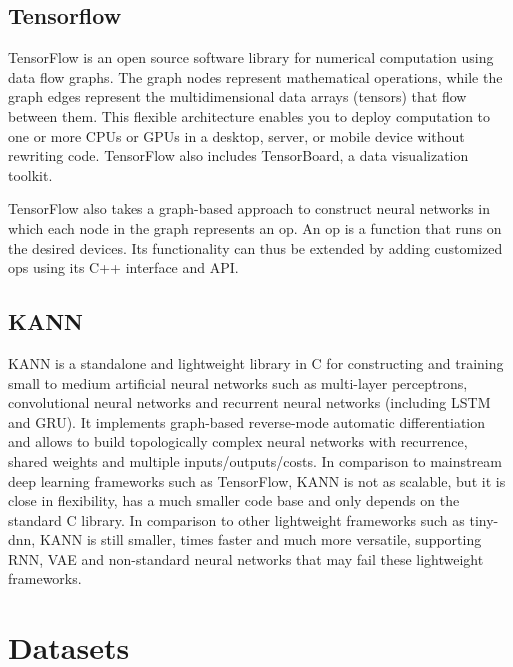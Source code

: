 \subsection{Tensorflow}
TensorFlow is an open source software library for numerical computation using data 
flow graphs. The graph nodes represent mathematical operations, while the graph 
edges represent the multidimensional data arrays (tensors) that flow between them. 
This flexible architecture enables you to deploy computation to one or more CPUs or 
GPUs in a desktop, server, or mobile device without rewriting code. TensorFlow 
also includes TensorBoard, a data visualization toolkit. 

TensorFlow also takes a graph-based approach to construct neural networks in which 
each node in the graph represents an op. An op is a function that runs on the 
desired devices. Its functionality can thus be extended by adding customized ops 
using its C++ interface and API.

\subsection{KANN}
KANN is a standalone and lightweight library in C for constructing and training 
small to medium artificial neural networks such as multi-layer perceptrons, 
convolutional neural networks and recurrent neural networks (including LSTM and GRU). 
It implements graph-based reverse-mode automatic differentiation and allows to build 
topologically complex neural networks with recurrence, shared weights and multiple 
inputs/outputs/costs. In comparison to mainstream deep learning frameworks such as 
TensorFlow, KANN is not as scalable, but it is close in flexibility, has a much smaller 
code base and only depends on the standard C library. In comparison to other 
lightweight frameworks such as tiny-dnn, KANN is still smaller, times faster and 
much more versatile, supporting RNN, VAE and non-standard neural networks that 
may fail these lightweight frameworks.

\section{Datasets}
